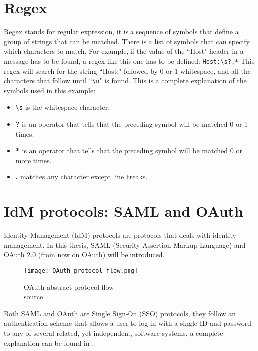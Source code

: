 \section{Regex}
Regex stands for regular expression, it is a sequence of symbols that define a group of strings that can be matched. There is a list of symbols that can specify which characters to match. For example, if the value of the ``Host" header in a message has to be found, a regex like this one has to be defined: \verb|Host:\s?.*|
This regex will search for the string ``Host:" followed by 0 or 1 whitespace, and all the characters that follow until ``\verb|\n|" is found. This is a complete explanation of the symbols used in this example:
\begin{itemize}
    \item \verb|\s| is the whitespace character.
    \item \textbf{?} is an operator that tells that the preceding symbol will be matched 0 or 1 times.
    \item \textbf{*} is an operator that tells that the preceding symbol will be matched 0 or more times.
    \item \textbf{.} matches any character except line breaks.
\end{itemize}

\section{IdM protocols: SAML and OAuth}
Identity Management (IdM) protocols are protocols that deals with identity management. In this thesis, \gls{SAML} (Security Assertion Markup Language) and \gls{OAuth} 2.0 (from now on \gls{OAuth}) will be introduced.
\begin{wrapfigure}{r}{0.5\textwidth}
    \texttt{[image: OAuth\_protocol\_flow.png]}
    \caption{OAuth abstract protocol flow\\source \cite{ietf_oauth2}}
    \label{fig:OAuth_protocol_flow}
\end{wrapfigure}
Both \Gls{SAML} and \gls{OAuth} are Single Sign-On (SSO) protocols, they follow an authentication scheme that allows a user to log in with a single ID and password to any of several related, yet independent, software systems, a complete explanation can be found in \cite{claudio_grisenti}. 

